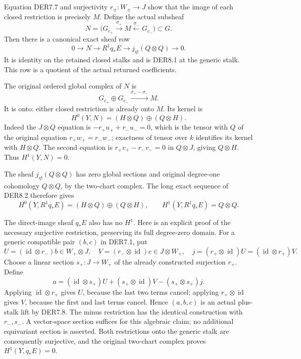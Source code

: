 Equation DER7.7 and surjectivity \(r_\pm:W_\pm\to J\) show that the
image of each closed restriction is precisely \(M\). Define the actual
subsheaf \[
N=\bigl(G_{c_+}\xrightarrow{\sigma_+}M
             \xleftarrow{\sigma_-}G_{c_-}\bigr)\subset G.
\] Then there is a canonical exact sheaf row \[
\boxed{0\to N\to R^1q_*E\to j_{\eta!}(Q\otimes Q)\to0.}
\tag{DER8.2}
\] It is identity on the retained closed stalks and is DER8.1 at the
generic stalk. This row is a quotient of the actual returned
coefficients.

The original ordered global complex of \(N\) is \[
G_{c_+}\oplus G_{c_-}
 \xrightarrow{\sigma_+-\sigma_-}M.
\] It is onto: either closed restriction is already onto \(M\). Its
kernel is \[
H^0(Y,N)=(H\otimes Q)\oplus(Q\otimes H).
\tag{DER8.3}
\] Indeed the \(J\otimes Q\) equation is \(-r_+u_++r_-u_-=0\), which is
the tensor with \(Q\) of the original equation \(r_+w_+=r_-w_-\);
exactness of tensor over \(k\) identifies its kernel with
\(H\otimes Q\). The second equation is \(r_+v_+-r_-v_-=0\) in
\(Q\otimes J\), giving \(Q\otimes H\). Thus \(H^1(Y,N)=0\).

The sheaf \(j_{\eta!}(Q\otimes Q)\) has zero global sections and
original degree-one cohomology \(Q\otimes Q\), by the two-chart complex.
The long exact sequence of DER8.2 therefore gives \[
H^0(Y,R^1q_*E)=(H\otimes Q)\oplus(Q\otimes H),\qquad
H^1(Y,R^1q_*E)=Q\otimes Q .
\tag{DER8.4}
\]

The direct-image sheaf \(q_*E\) also has no \(H^1\). Here is an explicit
proof of the necessary surjective restriction, preserving its full
degree-zero domain. For a generic compatible pair \((b,c)\) in DER7.1,
put \[
U=(\operatorname{id}\otimes r_-)b\in W_+\otimes J,\quad
V=(r_-\otimes\operatorname{id})c\in J\otimes W_+,
\quad
j=(r_+\otimes\operatorname{id})U
   =(\operatorname{id}\otimes r_+)V .
\] Choose a linear section \(s_+:J\to W_+\) of the already constructed
surjection \(r_+\). Define \[
a=(\operatorname{id}\otimes s_+)U
 +(s_+\otimes\operatorname{id})V
 -(s_+\otimes s_+)j.
\tag{DER8.5}
\] Applying \(\operatorname{id}\otimes r_+\) gives \(U\), because the
last two terms cancel; applying \(r_+\otimes\operatorname{id}\) gives
\(V\), because the first and last terms cancel. Hence \((a,b,c)\) is an
actual plus-stalk lift by DER7.8. The minus restriction has the
identical construction with \(r_-,s_-\). A vector-space section suffices
for this algebraic claim; no additional equivariant section is asserted.
Both restrictions onto the generic stalk are consequently surjective,
and the original two-chart complex proves \(H^1(Y,q_*E)=0\).

